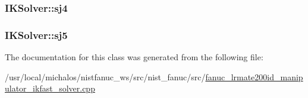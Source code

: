 \hypertarget{classIKSolver_a5f90cdbcbc7633850cfaeb547c11437c}{
\subsubsection[{sj4}]{ I\-K\-Solver\-::sj4}}\label{classIKSolver_a5f90cdbcbc7633850cfaeb547c11437c}
\hypertarget{classIKSolver_a81dcf624096262da947af3f71f4cc63f}{
\subsubsection[{sj5}]{ I\-K\-Solver\-::sj5}}\label{classIKSolver_a81dcf624096262da947af3f71f4cc63f}


The documentation for this class was generated from the following file\-:\begin{DoxyCompactItemize}
\item 
/usr/local/michalos/nistfanuc\-\_\-ws/src/nist\-\_\-fanuc/src/\hyperlink{fanuc__lrmate200id__manipulator__ikfast__solver_8cpp}{fanuc\-\_\-lrmate200id\-\_\-manipulator\-\_\-ikfast\-\_\-solver.\-cpp}\end{DoxyCompactItemize}
